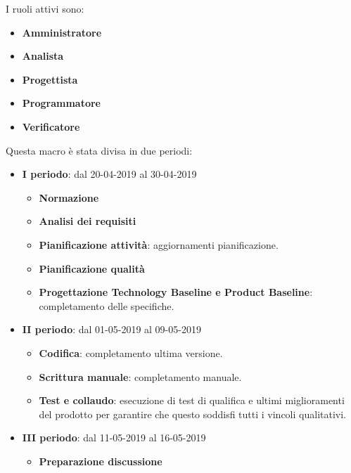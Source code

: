         I ruoli attivi sono: 
        \begin{itemize}
            \item \textbf{Amministratore}
            \item \textbf{Analista}
            \item \textbf{Progettista}
            \item \textbf{Programmatore}
            \item \textbf{Verificatore}
        \end{itemize}
        Questa macro è stata divisa in due periodi:
		\begin{itemize}
			\item \textbf{I periodo}: dal 20-04-2019 al 30-04-2019
			\begin{itemize}
    	        \item \textbf{Normazione}
    	        \item \textbf{Analisi dei requisiti}
    	        \item \textbf{Pianificazione attività}: aggiornamenti pianificazione.
    	        \item \textbf{Pianificazione qualità}
    	        \item \textbf{Progettazione Technology Baseline e Product Baseline}: completamento delle specifiche.
        	\end{itemize}
			\item \textbf{II periodo}: dal 01-05-2019 al 09-05-2019
			\begin{itemize}
    	        \item \textbf{Codifica}: completamento ultima versione.
    	        \item \textbf{Scrittura manuale}: completamento manuale.
    	        \item \textbf{Test e collaudo}: esecuzione di test di qualifica e ultimi miglioramenti del prodotto per
    	        garantire che questo soddisfi tutti i vincoli qualitativi.
			\end{itemize}
			\item \textbf{III periodo}: dal 11-05-2019 al 16-05-2019
			\begin{itemize}
				\item \textbf{Preparazione discussione}
			\end{itemize}
		\end{itemize}


